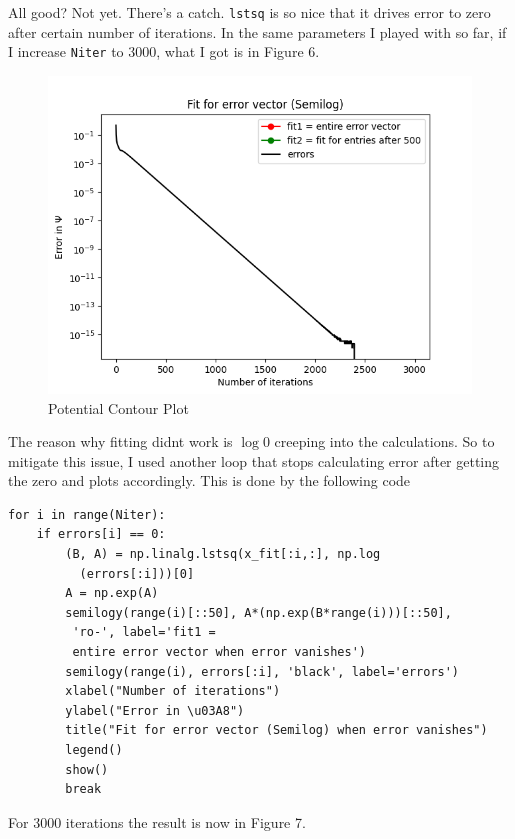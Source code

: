 \documentclass[11pt, a4paper]{article}
\begin{document}
All good? Not yet. There's a catch. \texttt{lstsq} is so nice that it drives error to zero after certain number of iterations. In the same parameters I played with so far, if I increase \texttt{Niter} to 3000, what I got is in Figure 6. 

\begin{figure}[!tbh]
   	\centering
  \includegraphics[scale=0.5]{zeroerror.png} 
    \caption{Potential Contour Plot}
   	\label{fig:contour potential)}
   \end{figure}
   The reason why fitting didnt work is $\log0$ creeping into the calculations. So to mitigate this issue, I used another loop that stops calculating error after getting the zero and plots accordingly. This is done by the following code
\begin{verbatim}
for i in range(Niter):
    if errors[i] == 0:
        (B, A) = np.linalg.lstsq(x_fit[:i,:], np.log
          (errors[:i]))[0]
        A = np.exp(A)
        semilogy(range(i)[::50], A*(np.exp(B*range(i)))[::50],
         'ro-', label='fit1 = 
         entire error vector when error vanishes')
        semilogy(range(i), errors[:i], 'black', label='errors')
        xlabel("Number of iterations")
        ylabel("Error in \u03A8")
        title("Fit for error vector (Semilog) when error vanishes")
        legend()
        show()
        break
\end{verbatim}

For 3000 iterations the result is now in Figure 7.
\end{document}
